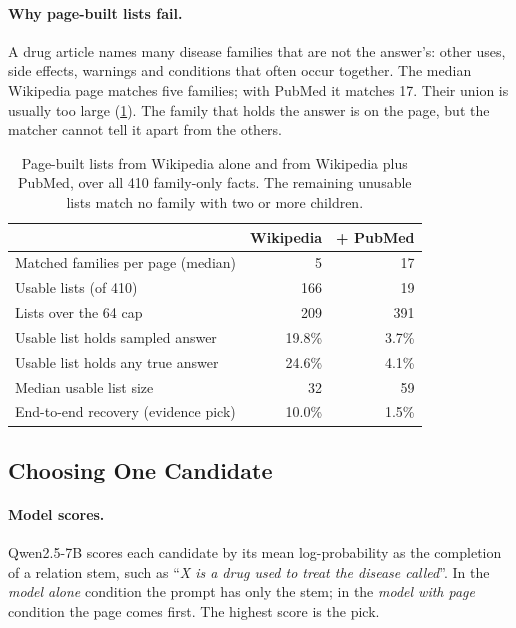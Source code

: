 \paragraph{Why page-built lists fail.}
A drug article names many disease families that are not the answer's: other uses, side effects, warnings and conditions that often occur together. The median Wikipedia page matches five families; with PubMed it matches 17. Their union is usually too large (\cref{tab:pagebuilt}). The family that holds the answer is on the page, but the matcher cannot tell it apart from the others.

\begin{table}[t]
\centering
\footnotesize
\setlength{\tabcolsep}{3pt}
\begin{tabular}{@{}lrr@{}}
\toprule
 & Wikipedia & + PubMed \\
\midrule
Matched families per page (median) & 5 & 17 \\
Usable lists (of 410) & 166 & 19 \\
Lists over the 64 cap & 209 & 391 \\
Usable list holds sampled answer & 19.8\% & 3.7\% \\
Usable list holds any true answer & 24.6\% & 4.1\% \\
Median usable list size & 32 & 59 \\
End-to-end recovery (evidence pick) & 10.0\% & 1.5\% \\
\bottomrule
\end{tabular}
\caption{Page-built lists from Wikipedia alone and from Wikipedia plus PubMed, over all 410 family-only facts. The remaining unusable lists match no family with two or more children.}
\label{tab:pagebuilt}
\end{table}

\subsection{Choosing One Candidate}

\paragraph{Model scores.}
Qwen2.5-7B scores each candidate by its mean log-probability as the completion of a relation stem, such as ``\emph{X is a drug used to treat the disease called}''. In the \emph{model alone} condition the prompt has only the stem; in the \emph{model with page} condition the page comes first. The highest score is the pick.

